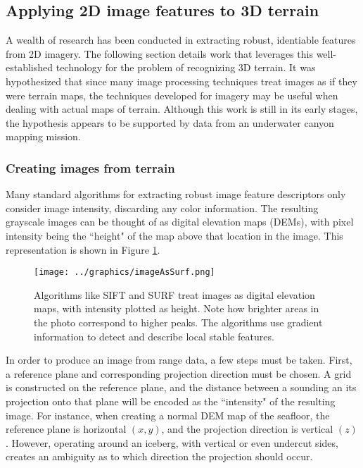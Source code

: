 \subsection{Applying 2D image features to 3D terrain}

A wealth of research has been conducted in extracting robust, identiable features from 2D imagery. The following section details work that leverages this well-established technology for the problem of recognizing 3D terrain. It was hypothesized that since many image processing techniques treat images as if they were terrain maps, the techniques developed for imagery may be useful when dealing with actual maps of terrain. Although this work is still in its early stages, the hypothesis appears to be supported by data from an underwater canyon mapping mission.

\subsubsection{Creating images from terrain}

Many standard algorithms for extracting robust image feature descriptors only consider image intensity, discarding any color information. The resulting grayscale images can be thought of as digital elevation maps (DEMs), with pixel intensity being the ``height" of the map above that location in the image. This representation is shown in Figure \ref{fig:imAsSurf}. 

\begin{figure}[htbp]
   \centering
   \texttt{[image: ../graphics/imageAsSurf.png]} %
   \caption{Algorithms like SIFT and SURF treat images as digital elevation maps, with intensity plotted as height. Note how brighter areas in the photo correspond to higher peaks. The algorithms use gradient information to detect and describe local stable features.}
   \label{fig:imAsSurf}
\end{figure}

In order to produce an image from range data, a few steps must be taken. First, a reference plane and corresponding projection direction must be chosen. A grid is constructed on the reference plane, and the distance between a sounding an its projection onto that plane will be encoded as the ``intensity" of the resulting image. For instance, when creating a normal DEM map of the seafloor, the reference plane is horizontal $(x,y)$, and the projection direction is vertical $(z)$. However, operating around an iceberg, with vertical or even undercut sides, creates an ambiguity as to which direction the projection should occur. 

